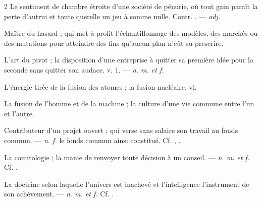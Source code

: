\begin{multicols}{2}
 Le sentiment de chambre étroite d'une société de pénurie, où tout gain paraît la perte d'autrui et toute querelle un jeu à somme nulle. Contr. . —  \textit{adj.}

 Maître du hasard ; qui met à profit l'échantillonnage des modèles, des marchés ou des mutations pour atteindre des fins qu'aucun plan n'eût su prescrire.

 L'art du pivot ; la disposition d'une entreprise à quitter sa première idée pour la seconde sans quitter son audace.   v. 1. —  \textit{n. m. et f.}

 L'énergie tirée de la fusion des atomes ; la fusion nucléaire.   vi.

 La fusion de l'homme et de la machine ; la culture d'une vie commune entre l'un et l'autre.

 Contributeur d'un projet ouvert ; qui verse sans salaire son travail au fonds commun. —  \textit{n. f.} le fonds commun ainsi constitué. Cf. , .

 La comitologie ; la manie de renvoyer toute décision à un conseil. —  \textit{n. m. et f.} Cf. .

 La doctrine selon laquelle l'univers est inachevé et l'intelligence l'instrument de son achèvement. —  \textit{n. m. et f.} Cf. .

\end{multicols}

